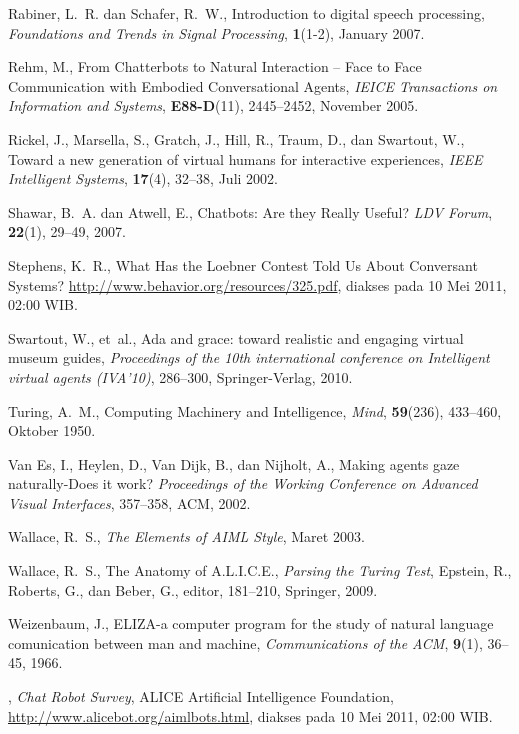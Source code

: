 \begin{thebibliography}{10}
Rabiner, L.~R. dan Schafer, R.~W.,
  {Introduction to digital speech processing,}
  {\em Foundations and Trends in Signal Processing\/}, \textbf{1}(1-2),
  January 2007.

Rehm, M.,
  {From Chatterbots to Natural Interaction -- 
  Face to Face Communication with Embodied Conversational Agents},
  {\em IEICE Transactions on Information and Systems\/}, \textbf{E88-D}(11),
  2445--2452, November 2005.

Rickel, J., Marsella, S., Gratch, J., Hill, R., Traum, D., dan Swartout, W.,
  {Toward a new generation of virtual humans for interactive experiences},
  {\em IEEE Intelligent Systems\/}, \textbf{17}(4), 32--38, Juli 2002.

Shawar, B.~A. dan Atwell, E.,
  {Chatbots: Are they Really Useful?}
  {\em LDV Forum\/}, \textbf{22}(1), 29--49, 2007.

Stephens, K.~R.,
  {What Has the Loebner Contest Told Us About Conversant Systems?}
  \urlprefix\url{http://www.behavior.org/resources/325.pdf}, diakses
  pada 10 Mei 2011, 02:00 WIB.

Swartout, W., et~al.,
  Ada and grace: toward realistic and engaging virtual museum guides,
  {\em Proceedings of the 10th international conference on Intelligent virtual agents (IVA'10)\/},
  286--300, Springer-Verlag, 2010.

Turing, A.~M.,
  {Computing Machinery and Intelligence}, {\em Mind\/},
  \textbf{59}(236), 433--460, Oktober 1950.

{Van Es}, I., Heylen, D., {Van Dijk}, B., dan Nijholt, A.,
  {Making agents gaze naturally-Does it work?}
  {\em Proceedings of the Working Conference on Advanced Visual Interfaces\/},
  357--358, ACM, 2002.

Wallace, R.~S.,
  {\em The Elements of AIML Style\/}, Maret 2003.

Wallace, R.~S.,
  {The Anatomy of A.L.I.C.E.},
  {\em {Parsing the Turing Test}\/},
  Epstein, R., Roberts, G., dan Beber, G., editor,
  181--210, Springer, 2009.

Weizenbaum, J.,
  {ELIZA}-a computer program for the study of natural
  language comunication between man and machine,
  {\em Communications of the ACM\/}, \textbf{9}(1), 36--45, 1966.

\underline{\hspace{5em}}, {\em Chat Robot Survey\/}, {ALICE Artificial Intelligence Foundation},
  \urlprefix\url{http://www.alicebot.org/aimlbots.html}, diakses pada 10 Mei 2011, 02:00 WIB.


\end{thebibliography}
